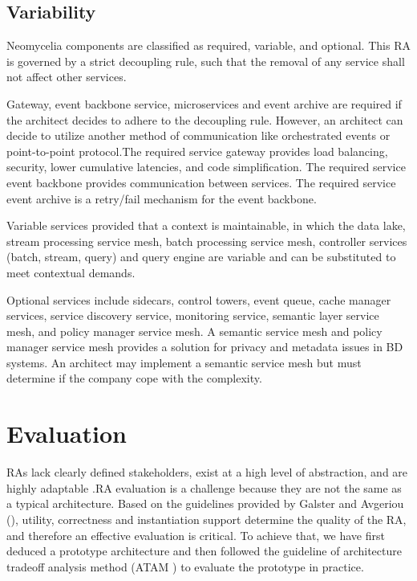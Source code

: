 \documentclass[conference]{IEEEtran}
\begin{document}
\subsection{Variability}
Neomycelia components are classified as required, variable, and optional. This RA is governed by a strict decoupling rule, such that the removal of any service shall not affect other services.

Gateway, event backbone service, microservices and event archive are required if the architect decides to adhere to the decoupling rule. However, an architect can decide to utilize another method of communication like orchestrated events or point-to-point protocol.The required service gateway provides load balancing, security, lower cumulative latencies, and code simplification. The required service event backbone provides communication between services. The required service event archive is a retry/fail mechanism for the event backbone.

Variable services provided that  a context is maintainable, in which the data lake, stream processing service mesh, batch processing service mesh, controller services (batch, stream, query) and query engine are variable and can be substituted to meet contextual demands.

Optional services include sidecars, control towers, event queue, cache manager services, service discovery service, monitoring service, semantic layer service mesh, and policy manager service mesh. A semantic service mesh and policy manager service mesh provides a solution for privacy and metadata issues in BD systems. An architect may implement a semantic service mesh but must determine if the company cope with the complexity.

\section{Evaluation}

RAs lack clearly defined stakeholders, exist at a high level of abstraction, and are highly adaptable \cite{AtaeiACIS}.RA evaluation is a challenge \cite{angelov2008contracting,Avgeriou,Cioroaica,Maier} because they are not the same as a typical architecture. Based on the guidelines provided by Galster and Avgeriou (\cite{GALSTER}), utility, correctness and instantiation support determine the quality of the RA, and therefore an effective evaluation is critical. To achieve that, we have first deduced a prototype architecture and then followed the guideline of architecture tradeoff analysis method (ATAM \cite{KazmanATAM}) to evaluate the prototype in practice.
\end{document}
